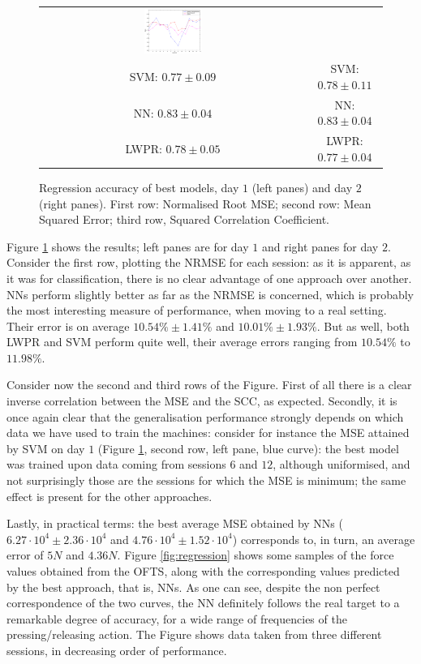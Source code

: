 \begin{figure}[!ht]
\begin{tabular}{cc}
    \includegraphics[width=0.22\textwidth]{figs/fig_SCC_regr_resCrossBestOnDay2} \\
     SVM: $0.77 \pm 0.09$ &  SVM: $0.78 \pm 0.11$ \\
      NN: $0.83 \pm 0.04$ &   NN: $0.83 \pm 0.04$ \\
    LWPR: $0.78 \pm 0.05$ & LWPR: $0.77 \pm 0.04$ \\
  \end{tabular}
  \caption{Regression accuracy of best models, day $1$ (left panes)
    and day $2$ (right panes). First row: Normalised Root MSE; second
    row: Mean Squared Error; third row, Squared Correlation Coefficient.}
  \label{fig:best_regr}
\end{figure}

Figure \ref{fig:best_regr} shows the results; left panes are for day
$1$ and right panes for day $2$. Consider the first row, plotting the
NRMSE for each session: as it is apparent, as it was for
classification, there is no clear advantage of one approach over
another. NNs perform slightly better as far as the NRMSE is concerned,
which is probably the most interesting measure of performance, when
moving to a real setting. Their error is on average $10.54\% \pm
1.41\%$ and $10.01\% \pm 1.93\%$. But as well, both LWPR and SVM
perform quite well, their average errors ranging from $10.54\%$ to
$11.98\%$.

Consider now the second and third rows of the Figure. First of all
there is a clear inverse correlation between the MSE and the SCC, as
expected. Secondly, it is once again clear that the generalisation
performance strongly depends on which data we have used to train the
machines: consider for instance the MSE attained by SVM on day $1$
(Figure \ref{fig:best_regr}, second row, left pane, blue curve): the
best model was trained upon data coming from sessions $6$ and $12$,
although uniformised, and not surprisingly those are the sessions for
which the MSE is minimum; the same effect is present for the other
approaches.

Lastly, in practical terms: the best average MSE obtained by NNs
($6.27\cdot 10^4 \pm 2.36\cdot 10^4$ and $4.76\cdot 10^4 \pm 1.52\cdot
10^4$) corresponds to, in turn, an average error of $5N$ and
$4.36N$. Figure \ref{fig:regression} shows some samples of the force
values obtained from the OFTS, along with the corresponding values
predicted by the best approach, that is, NNs. As one can see, despite
the non perfect correspondence of the two curves, the NN definitely
follows the real target to a remarkable degree of accuracy, for a wide
range of frequencies of the pressing/releasing action. The Figure
shows data taken from three different sessions, in decreasing order of
performance.

